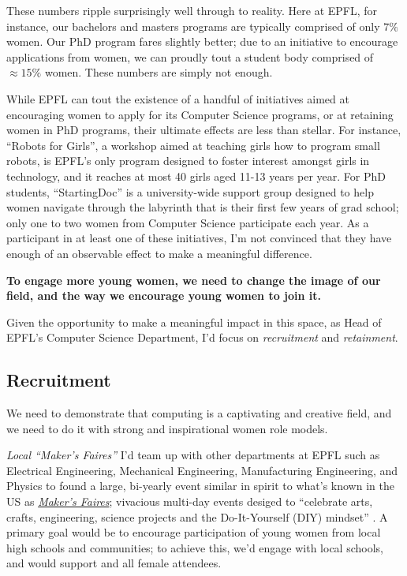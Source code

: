 \documentclass[acmtocl]{acmtrans2m}
\begin{document}
These numbers ripple surprisingly well through to reality. Here at EPFL, for
instance, our bachelors and masters programs are typically comprised of only
\href{http://www.swissict.ch/fileadmin/award/Impressionen/Symposium/WillyZwaenepoel\_ICT-Akademie.pdf}{$7\%$}~\cite{Willy}
women. Our PhD program fares slightly better; due to an initiative to
encourage applications from women, we can proudly tout a student body
comprised of $\approx15\%$ women. These numbers are simply not enough.

While EPFL can tout the existence of a handful of initiatives aimed at
encouraging women to apply for its Computer Science programs, or at retaining
women in PhD programs, their ultimate effects are less than stellar. For
instance, ``Robots for Girls'', a workshop aimed at teaching girls how to
program small robots, is EPFL's only program designed to foster interest
amongst girls in technology,
and it reaches at most 40 girls aged 11-13 years per year.
For PhD students, ``StartingDoc'' is a university-wide support group designed
to help women navigate through the labyrinth that is their first few years of
grad school; only one to two women from Computer Science participate each year.
As a participant in at least one of these initiatives, I'm not convinced that
they have enough of an observable effect to make a meaningful difference.


\textbf{To engage more young women, we need to change the image of our field,
and the way we encourage young women to join it.}

Given the opportunity to make a meaningful impact in this space, as Head
of EPFL's Computer Science Department, I'd focus on \textit{recruitment} and
\textit{retainment}.

\subsection*{\textbf{Recruitment}}
\vspace{-0.1in}
We need to demonstrate that computing is a captivating and creative field, and
we need to do it with strong and inspirational women role models.

\textit{\textsf{Local ``Maker's Faires''}}\newline
I'd team up with other departments at EPFL such as Electrical Engineering,
Mechanical Engineering, Manufacturing Engineering, and Physics to found a
large, {bi-yearly} event similar in spirit to what's known in the US as
\href{http://news.cnet.com/8301-13772_3-9935358-52.html}{\textit{Maker's
Faires}}; vivacious multi-day events desiged to ``celebrate arts, crafts,
engineering, science projects and the Do-It-Yourself (DIY) mindset''
\cite{MakerFaire}. A primary goal would be to encourage participation of
young women from local high schools and communities; to achieve this, we'd
engage with local schools, and would support and all female attendees.
\end{document}
